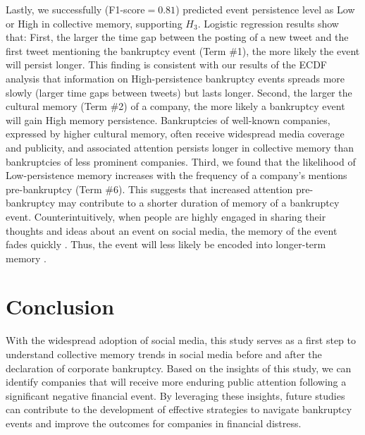 \documentclass[9pt,twocolumn,twoside,lineno]{pnas-new}
\begin{document}
Lastly, we successfully (F1-score$=0.81$) predicted event persistence level as Low or High in collective memory, supporting $H_3$. 
Logistic regression results show that:
First, the larger the time gap between the posting of a new tweet and the first tweet mentioning the bankruptcy event (Term \#1), the more likely the event will persist longer.
This finding is consistent with our results of the ECDF analysis that information on High-persistence bankruptcy events spreads more slowly (larger time gaps between tweets) but lasts longer.
Second, the larger the cultural memory (Term \#2) of a company, the more likely a bankruptcy event will gain High memory persistence. 
Bankruptcies of well-known companies, expressed by higher cultural memory, often receive widespread media coverage and publicity, and associated attention persists longer in collective memory than bankruptcies of less prominent companies.
Third, we found that the likelihood of Low-persistence memory increases with the frequency of a company's mentions pre-bankruptcy (Term \#6).
This suggests that increased attention pre-bankruptcy may contribute to a shorter duration of memory of a bankruptcy event.
Counterintuitively, when people are highly engaged in sharing their thoughts and ideas about an event on social media, the memory of the event fades quickly \cite{tamir2018media,schacter2022media}.
Thus, the event will less likely be encoded into longer-term memory \cite{tamir2018media}.


\section*{Conclusion}
\label{sec:conclusion}

With the widespread adoption of social media, this study serves as a first step to understand collective memory trends in social media before and after the declaration of corporate bankruptcy.
Based on the insights of this study, we can identify companies that will receive more enduring public attention following a significant negative financial event.
By leveraging these insights, future studies can contribute to the development of effective strategies to navigate bankruptcy events and improve the outcomes for companies in financial distress.
\end{document}

